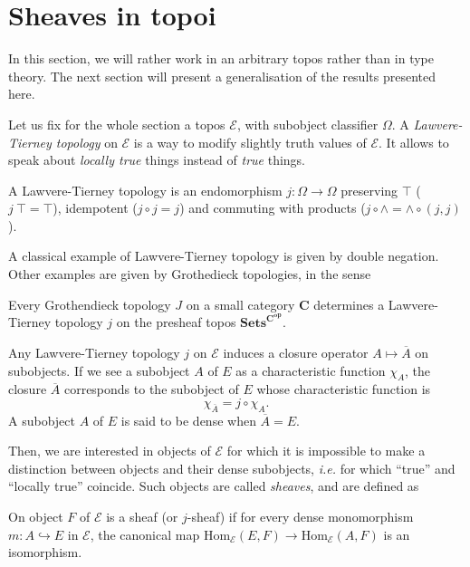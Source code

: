 \documentclass[notfinal]{jfrarticle}
\newcommand \True {\top}
\newcommand \closure[1] {\overline{#1}}
\newcommand \Char[1] {\chi_{#1}}%
\newcommand \Hom[1] {\mathrm{Hom}_{#1}}
\newcommand{\ie}{\emph{i.e.}}
\begin{document}
\section{Sheaves in topoi}
\label{sec:sheaf_topos}

In this section, we will rather work in an arbitrary topos rather than in type theory. The next section will present a
generalisation of the results presented here.

Let us fix for the whole section a topos $\mathcal E$, with subobject
classifier $\Omega$. A {\em Lawvere-Tierney topology} on $\mathcal E$
is a way to modify slightly truth values of $\mathcal E$. It allows to
speak about {\em locally true} things instead of {\em true} things.

\begin{defi}\label{defi:LT}
  A Lawvere-Tierney topology is an endomorphism $j:\Omega \to \Omega$
  preserving $\True$ ($j \ \True = \True$), idempotent ($j\circ j =
  j$) and commuting with products ($j \circ \wedge = \wedge \circ (j,j)$).
\end{defi}

A classical example of Lawvere-Tierney topology is given by double
negation. Other examples are given by Grothedieck topologies, in the
sense
\begin{thm}
  Every Grothendieck topology $J$ on a small category $\mathbf C$ determines a
  Lawvere-Tierney topology $j$ on the presheaf topos
  $\mathbf{Sets}^{\mathbf C^{\mathbf{op}}}$.
\end{thm}

Any Lawvere-Tierney topology $j$ on $\mathcal E$ induces a closure operator
$A \mapsto \closure{A}$ on subobjects. If we see a subobject $A$ of $E$
as a characteristic function $\Char{A}$, the closure $\closure{A}$
corresponds to the subobject of $E$ whose characteristic function is 
%
\[
\Char{\closure{A}} = j \circ \Char{A}.
\]%
%
A subobject $A$ of $E$ is said to
be dense when $\closure{A} = E$.

Then, we are interested in objects of $\mathcal E$ for which it is
impossible to make a distinction between objects and their dense
subobjects, \ie{} for which ``true'' and ``locally true''
coincide. Such objects are called {\em sheaves}, and are defined as

\begin{defi}
  On object $F$ of $\mathcal E$ is a sheaf (or $j$-sheaf) if for every
  dense monomorphism $m: A \hookrightarrow E$ in $\mathcal E$, the
  canonical map $\Hom{\mathcal E}(E,F) \rightarrow \Hom{\mathcal E}(A,F)$ is an
isomorphism.
\end{defi}
\end{document}
